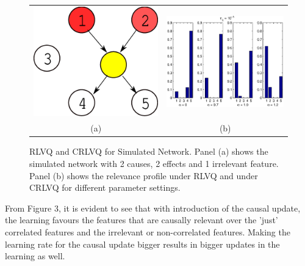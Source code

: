 \documentclass{esannV2}
\begin{document}
\begin{figure}[!h]
\begin{tabular}{cc}
\includegraphics[scale=0.2]{simnetwork.eps} & 
\includegraphics[width=.7\textwidth, height=.4\textwidth]{simlambda.eps} \\
(a) &  (b)  
\end{tabular}
\label{fig:simnetwork}
\caption{RLVQ and CRLVQ for Simulated Network. Panel (a) shows the simulated network with 2 causes, 2 effects and 1 irrelevant feature. Panel (b) shows the relevance profile under RLVQ and under CRLVQ for different parameter settings.}
\end{figure}

From Figure 3, it is evident to see that with introduction of the causal update, the learning favours the features that are causally relevant over the 'just' correlated features and the irrelevant or non-correlated features. Making the learning rate for the causal update bigger results in bigger updates in the learning as well.
\end{document}
